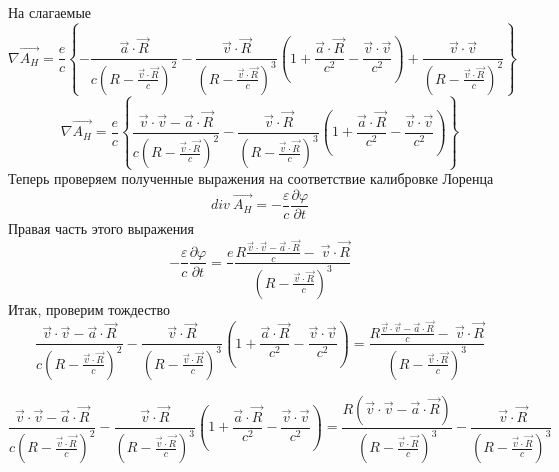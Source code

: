 \documentclass[11pt]{article}
\begin{document}
На слагаемые
\[\nabla \overrightarrow{{{A}_{H}}}=\frac{e}{c}\left\{ -\frac{\overrightarrow{a}\cdot \overrightarrow{R}}{c{{\left( R-\frac{\overrightarrow{v}\cdot \overrightarrow{R}}{c} \right)}^{2}}}-\frac{\overrightarrow{v}\cdot \overrightarrow{R}}{{{\left( R-\frac{\overrightarrow{v}\cdot \overrightarrow{R}}{c} \right)}^{3}}}\left( 1+\frac{\overrightarrow{a}\cdot \overrightarrow{R}}{{{c}^{2}}}-\frac{\overrightarrow{v}\cdot \overrightarrow{v}}{{{c}^{2}}} \right)+\frac{\overrightarrow{v}\cdot \overrightarrow{v}}{{{\left( R-\frac{\overrightarrow{v}\cdot \overrightarrow{R}}{c} \right)}^{2}}} \right\}\]
\[\nabla \overrightarrow{{{A}_{H}}}=\frac{e}{c}\left\{ \frac{\overrightarrow{v}\cdot \overrightarrow{v}-\overrightarrow{a}\cdot \overrightarrow{R}}{c{{\left( R-\frac{\overrightarrow{v}\cdot \overrightarrow{R}}{c} \right)}^{2}}}-\frac{\overrightarrow{v}\cdot \overrightarrow{R}}{{{\left( R-\frac{\overrightarrow{v}\cdot \overrightarrow{R}}{c} \right)}^{3}}}\left( 1+\frac{\overrightarrow{a}\cdot \overrightarrow{R}}{{{c}^{2}}}-\frac{\overrightarrow{v}\cdot \overrightarrow{v}}{{{c}^{2}}} \right) \right\}\]
Теперь проверяем полученные выражения на соответствие калибровке Лоренца
\[div\ \overrightarrow{{{A}_{H}}}=-\frac{\varepsilon }{c}\frac{\partial \varphi }{\partial t}\]
Правая часть этого выражения
\[-\frac{\varepsilon }{c}\frac{\partial \varphi }{\partial t}=\frac{e}{}\frac{R\frac{\vec{v}\cdot \vec{v}-\overrightarrow{a}\cdot \overrightarrow{R}}{c}-~\overrightarrow{v}\cdot \overrightarrow{R}}{{{\left( R-\frac{\overrightarrow{v}\cdot \overrightarrow{R}}{c} \right)}^{3}}}\]
Итак, проверим тождество
\[\frac{\overrightarrow{v}\cdot \overrightarrow{v}-\overrightarrow{a}\cdot \overrightarrow{R}}{c{{\left( R-\frac{\overrightarrow{v}\cdot \overrightarrow{R}}{c} \right)}^{2}}}-\frac{\overrightarrow{v}\cdot \overrightarrow{R}}{{{\left( R-\frac{\overrightarrow{v}\cdot \overrightarrow{R}}{c} \right)}^{3}}}\left( 1+\frac{\overrightarrow{a}\cdot \overrightarrow{R}}{{{c}^{2}}}-\frac{\overrightarrow{v}\cdot \overrightarrow{v}}{{{c}^{2}}} \right)=\frac{R\frac{\vec{v}\cdot \vec{v}-\overrightarrow{a}\cdot \overrightarrow{R}}{c}-~\overrightarrow{v}\cdot \overrightarrow{R}}{{{\left( R-\frac{\overrightarrow{v}\cdot \overrightarrow{R}}{c} \right)}^{3}}}\]

\[\frac{\overrightarrow{v}\cdot \overrightarrow{v}-\overrightarrow{a}\cdot \overrightarrow{R}}{c{{\left( R-\frac{\overrightarrow{v}\cdot \overrightarrow{R}}{c} \right)}^{2}}}-\frac{\overrightarrow{v}\cdot \overrightarrow{R}}{{{\left( R-\frac{\overrightarrow{v}\cdot \overrightarrow{R}}{c} \right)}^{3}}}\left( 1+\frac{\overrightarrow{a}\cdot \overrightarrow{R}}{{{c}^{2}}}-\frac{\overrightarrow{v}\cdot \overrightarrow{v}}{{{c}^{2}}} \right)=\frac{R\left( \vec{v}\cdot \vec{v}-\overrightarrow{a}\cdot \overrightarrow{R} \right)}{{{\left( R-\frac{\overrightarrow{v}\cdot \overrightarrow{R}}{c} \right)}^{3}}}-\frac{~\overrightarrow{v}\cdot \overrightarrow{R}}{{{\left( R-\frac{\overrightarrow{v}\cdot \overrightarrow{R}}{c} \right)}^{3}}}\]
\end{document}
